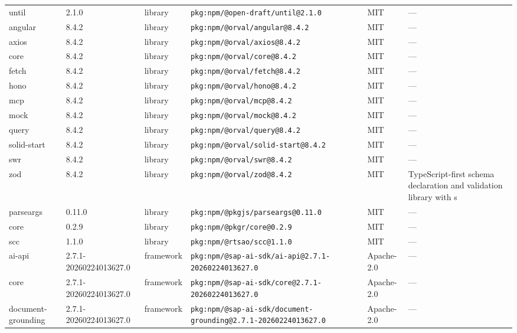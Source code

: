 \documentclass[11pt,a4paper]{article}
\begin{document}
\begin{longtable}{|p{4cm}|p{2cm}|p{1.6cm}|p{5cm}|p{1.5cm}|p{3.5cm}|}
\raggedright until & 2.1.0 & library & \small\texttt{pkg:npm/@open-draft/until@2.1.0} & MIT & \small — \\
\raggedright angular & 8.4.2 & library & \small\texttt{pkg:npm/@orval/angular@8.4.2} & MIT & \small — \\
\raggedright axios & 8.4.2 & library & \small\texttt{pkg:npm/@orval/axios@8.4.2} & MIT & \small — \\
\raggedright core & 8.4.2 & library & \small\texttt{pkg:npm/@orval/core@8.4.2} & MIT & \small — \\
\raggedright fetch & 8.4.2 & library & \small\texttt{pkg:npm/@orval/fetch@8.4.2} & MIT & \small — \\
\raggedright hono & 8.4.2 & library & \small\texttt{pkg:npm/@orval/hono@8.4.2} & MIT & \small — \\
\raggedright mcp & 8.4.2 & library & \small\texttt{pkg:npm/@orval/mcp@8.4.2} & MIT & \small — \\
\raggedright mock & 8.4.2 & library & \small\texttt{pkg:npm/@orval/mock@8.4.2} & MIT & \small — \\
\raggedright query & 8.4.2 & library & \small\texttt{pkg:npm/@orval/query@8.4.2} & MIT & \small — \\
\raggedright solid-start & 8.4.2 & library & \small\texttt{pkg:npm/@orval/solid-start@8.4.2} & MIT & \small — \\
\raggedright swr & 8.4.2 & library & \small\texttt{pkg:npm/@orval/swr@8.4.2} & MIT & \small — \\
\raggedright zod & 8.4.2 & library & \small\texttt{pkg:npm/@orval/zod@8.4.2} & MIT & \small TypeScript-first schema declaration and validation library with s \\
\raggedright parseargs & 0.11.0 & library & \small\texttt{pkg:npm/@pkgjs/parseargs@0.11.0} & MIT & \small — \\
\raggedright core & 0.2.9 & library & \small\texttt{pkg:npm/@pkgr/core@0.2.9} & MIT & \small — \\
\raggedright scc & 1.1.0 & library & \small\texttt{pkg:npm/@rtsao/scc@1.1.0} & MIT & \small — \\
\raggedright ai-api & 2.7.1-20260224013627.0 & framework & \small\texttt{pkg:npm/@sap-ai-sdk/ai-api@2.7.1-20260224013627.0} & Apache-2.0 & \small — \\
\raggedright core & 2.7.1-20260224013627.0 & framework & \small\texttt{pkg:npm/@sap-ai-sdk/core@2.7.1-20260224013627.0} & Apache-2.0 & \small — \\
\raggedright document-grounding & 2.7.1-20260224013627.0 & framework & \small\texttt{pkg:npm/@sap-ai-sdk/document-grounding@2.7.1-20260224013627.0} & Apache-2.0 & \small — \\

\end{longtable}
\end{document}
